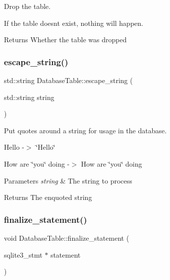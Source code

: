 Drop the table. 

If the table doesn\textquotesingle{}t exist, nothing will happen.

\begin{DoxyReturn}{Returns}
Whether the table was dropped 
\end{DoxyReturn}
\mbox{\label{class_database_table_ae01bd415842c6f6223a35f2ff135f625}} 
\subsubsection{\texorpdfstring{escape\+\_\+string()}{escape\_string()}}
{\footnotesize\ttfamily std\+::string Database\+Table\+::escape\+\_\+string (\begin{DoxyParamCaption}\item[{std\+::string}]{string }\end{DoxyParamCaption})\hspace{0.3cm}{\ttfamily [static]}}



Put quotes around a string for usage in the database. 

{\ttfamily Hello} -\/$>$ {\ttfamily \char`\"{}\+Hello\char`\"{}}

{\ttfamily How are \char`\"{}you\char`\"{} doing} -\/$>$ {\ttfamily \textquotesingle{}How are \char`\"{}you\char`\"{} doing\textquotesingle{}}


\begin{DoxyParams}{Parameters}
{\em string} & The string to process \\
\hline
\end{DoxyParams}
\begin{DoxyReturn}{Returns}
The enquoted string 
\end{DoxyReturn}
\mbox{\label{class_database_table_a05ee171b68bcbfc11583abb15dfd4b5b}} 
\subsubsection{\texorpdfstring{finalize\+\_\+statement()}{finalize\_statement()}}
{\footnotesize\ttfamily void Database\+Table\+::finalize\+\_\+statement (\begin{DoxyParamCaption}\item[{sqlite3\+\_\+stmt $\ast$}]{statement }\end{DoxyParamCaption})}



